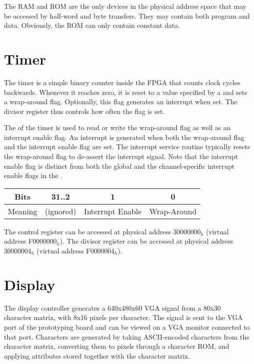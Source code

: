 The RAM and ROM are the only devices in the physical address space that may be accessed by half-word and byte transfers. They may contain both program and data. Obviously, the ROM can only contain constant data.

\section{Timer}

The timer is a simple binary counter inside the FPGA that counts clock cycles backwards. Whenever it reaches zero, it is reset to a value specified by a  and sets a wrap-around flag. Optionally, this flag generates an interrupt when set. The divisor register thus controls how often the flag is set. 

The  of the timer is used to read or write the wrap-around flag as well as an interrupt enable flag. An interrupt is generated when both the wrap-around flag and the interrupt enable flag are set. The interrupt service routine typically resets the wrap-around flag to de-assert the interrupt signal. Note that the interrupt enable flag is distinct from both the global and the channel-specific interrupt enable flags in the \pswx. 

\begin{tabular}{|c|c|c|c|}
\hline
Bits & 31..2 & 1 & 0\\
\hline
Meaning & (ignored) & Interrupt Enable & Wrap-Around\\
\hline
\end{tabular}

The control register can be accessed at physical address 30000000$_h$ (virtual address F0000000$_h$). The divisor register can be accessed at physical address 30000004$_h$ (virtual address F0000004$_h$).

\section{Display}

The display controller generates a 640x480x60 VGA signal from a 80x30 character matrix, with 8x16 pixels per character. The signal is sent to the VGA port of the prototyping board and can be viewed on a VGA monitor connected to that port. Characters are generated by taking ASCII-encoded characters from the character matrix, converting them to pixels through a character ROM, and applying attributes stored together with the character matrix.

